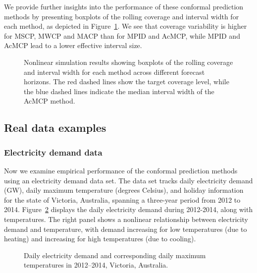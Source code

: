\documentclass[
  11pt,
  a4paper,
]{article}
\theoremstyle{plain}
\theoremstyle{plain}
\theoremstyle{remark}
\begin{document}
We provide further insights into the performance of these conformal
prediction methods by presenting boxplots of the rolling coverage and
interval width for each method, as depicted in Figure~\ref{fig-NL_box}.
We see that coverage variability is higher for MSCP, MWCP and MACP than
for MPID and AcMCP, while MPID and AcMCP lead to a lower effective
interval size.

\begin{figure}


\caption{\label{fig-NL_box}Nonlinear simulation results showing boxplots
of the rolling coverage and interval width for each method across
different forecast horizons. The red dashed lines show the target
coverage level, while the blue dashed lines indicate the median interval
width of the AcMCP method.}

\end{figure}%

\subsection{Real data examples}\label{real-data-examples}

\subsubsection{Electricity demand data}\label{electricity-demand-data}

Now we examine empirical performance of the conformal prediction methods
using an electricity demand data set. The data set tracks daily
electricity demand (GW), daily maximum temperature (degrees Celsius),
and holiday information for the state of Victoria, Australia, spanning a
three-year period from 2012 to 2014. Figure~\ref{fig-elec_data} displays
the daily electricity demand during 2012-2014, along with temperatures.
The right panel shows a nonlinear relationship between electricity
demand and temperature, with demand increasing for low temperatures (due
to heating) and increasing for high temperatures (due to cooling).

\begin{figure}


\caption{\label{fig-elec_data}Daily electricity demand and corresponding
daily maximum temperatures in 2012--2014, Victoria, Australia.}

\end{figure}%
\end{document}
